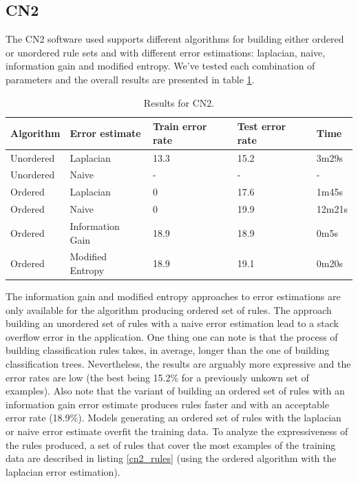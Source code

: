 \documentclass[a4paper]{llncs}
\begin{document}
\subsection{CN2}

The CN2 software used supports different algorithms for building either ordered
or unordered rule sets and with different error estimations: laplacian, naive,
information gain and modified entropy. We've tested each combination of
parameters and the overall results are presented in table \ref{tbl:results_cn2}.

\begin{table}
\begin{center}
\begin{tabular}{ | l | l | l | l | l |}
    \hline
    \textbf{Algorithm} & \textbf{Error estimate} & \textbf{Train error rate} & \textbf{Test error rate} & \textbf{Time} \\ \hline
    Unordered & Laplacian & 13.3 & 15.2 & 3m29s \\ \hline
    Unordered & Naive & - & - & - \\ \hline
    Ordered & Laplacian & 0 & 17.6 & 1m45s \\ \hline
    Ordered & Naive & 0 & 19.9 & 12m21s \\ \hline
    Ordered & Information Gain & 18.9 & 18.9 & 0m5s \\ \hline
    Ordered & Modified Entropy & 18.9 & 19.1 & 0m20s \\ \hline
\end{tabular}
\caption{Results for CN2.}
\label{tbl:results_cn2}
\end{center}
\end{table}

The information gain and modified entropy approaches to error estimations are
only available for the algorithm producing ordered set of rules. The approach
building an unordered set of rules with a naive error estimation lead to a stack
overflow error in the application. One thing one can note is that the process of
building classification rules takes, in average, longer than the one of building
classification trees. Nevertheless, the results are arguably more expressive and
the error rates are low (the best being 15.2\% for a previously unkown set of 
examples). Also note that the variant of building an ordered set of rules with
an information gain error estimate produces rules faster and with an acceptable
error rate (18.9\%). Models generating an ordered set of rules with the 
laplacian or naive error estimate overfit the training data. To analyze the 
expressiveness of the rules produced, a set of rules that cover the most 
examples of the training data are described in listing \ref{cn2_rules} (using 
the ordered algorithm with the laplacian error estimation).
\end{document}

